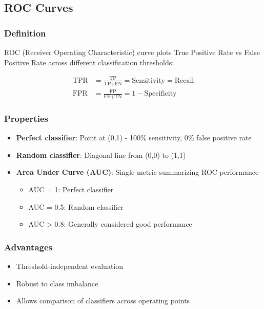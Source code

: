 \documentclass[12pt,a4paper]{article}
\begin{document}
\subsection{ROC Curves}

\subsubsection{Definition}

ROC (Receiver Operating Characteristic) curve plots True Positive Rate vs False Positive Rate across different classification thresholds:

\begin{align}
\text{TPR} &= \frac{\text{TP}}{\text{TP} + \text{FN}} = \text{Sensitivity} = \text{Recall} \\
\text{FPR} &= \frac{\text{FP}}{\text{FP} + \text{TN}} = 1 - \text{Specificity}
\end{align}

\subsubsection{Properties}

\begin{itemize}
    \item \textbf{Perfect classifier}: Point at (0,1) - 100\% sensitivity, 0\% false positive rate
    \item \textbf{Random classifier}: Diagonal line from (0,0) to (1,1)
    \item \textbf{Area Under Curve (AUC)}: Single metric summarizing ROC performance
        \begin{itemize}
            \item AUC = 1: Perfect classifier
            \item AUC = 0.5: Random classifier  
            \item AUC > 0.8: Generally considered good performance
        \end{itemize}
\end{itemize}

\subsubsection{Advantages}
\begin{itemize}
    \item Threshold-independent evaluation
    \item Robust to class imbalance
    \item Allows comparison of classifiers across operating points
\end{itemize}
\end{document}
